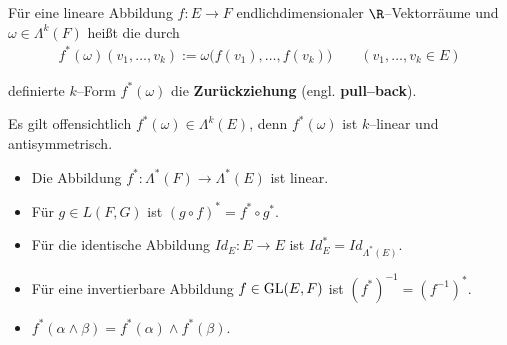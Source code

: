 \label{vektoranalysis/multilinear:pull-back von $\omega$ mit $f$.}
\begin{definition}{}{}



\par
Für eine lineare Abbildung \(f:E\to F\) endlichdimensionaler \(\R\)–Vektorräume und \(\omega\in\Lambda^k(F)\) heißt die durch
\begin{align*}
f^*(\omega)( v_1,\ldots, v_k) := \omega \big(f( v_1),\ldots,f( v_k)\big)
\qquad (v_1,\ldots,v_k\in E)
\end{align*}
\par
definierte \(k\)–Form \(f^*(\omega)\) die \textbf{Zurückziehung} (engl.
\textbf{pull–back}).
\end{definition}

\par
Es gilt offensichtlich \(f^*(\omega)\in\Lambda^k(E)\), denn \(f^*(\omega)\)
ist \(k\)–linear und antisymmetrisch.
\label{vektoranalysis/multilinear:theorem-24}
\begin{theorem}{}{}


\begin{itemize}
\item {} 
\par
Die Abbildung \(f^*:\Lambda^*(F)\to\Lambda^*(E)\) ist linear.

\item {} 
\par
Für \(g\in L(F,G)\) ist \((g\circ f)^*=f^*\circ g^*\).

\item {} 
\par
Für die identische Abbildung \(Id_E:E\to E\) ist \(Id_E^* = Id_{\Lambda^*(E)}\).

\item {} 
\par
Für eine invertierbare Abbildung \(f\in {\rm GL}(E,F)\) ist \((f^*)^{-1}=(f^{-1})^*\).

\item {} 
\par
\(f^*(\alpha\wedge\beta) = f^*(\alpha)\wedge f^*(\beta)\).

\end{itemize}
\end{theorem}

